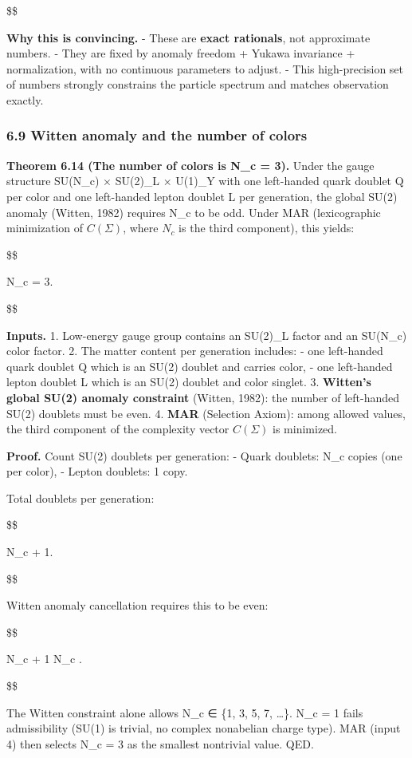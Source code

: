 \documentclass[11pt,a4paper]{article}
\theoremstyle{remark}
\begin{document}
\$\$

\textbf{Why this is convincing.}
- These are \textbf{exact rationals}, not approximate numbers.
- They are fixed by anomaly freedom + Yukawa invariance + normalization,
with no continuous parameters to adjust.
- This high-precision set of numbers strongly constrains the particle
spectrum and matches observation exactly.

\subsubsection{6.9 Witten anomaly and the number of colors}\label{witten-anomaly-and-the-number-of-colors}

\textbf{Theorem 6.14 (The number of colors is N\_c = 3).}
Under the gauge structure SU(N\_c) × SU(2)\_L × U(1)\_Y with one
left-handed quark doublet Q per color and one left-handed lepton doublet
L per generation, the global SU(2) anomaly (Witten, 1982) requires
N\_c to be odd. Under MAR (lexicographic minimization of \(C(\Sigma)\),
where \(N_c\) is the third component), this yields:

\$\$

N\_c = 3.

\$\$

\textbf{Inputs.}
1. Low-energy gauge group contains an SU(2)\_L factor and an SU(N\_c)
color factor.
2. The matter content per generation includes:
- one left-handed quark doublet Q which is an SU(2) doublet and
carries color,
- one left-handed lepton doublet L which is an SU(2) doublet and
color singlet.
3. \textbf{Witten's global SU(2) anomaly constraint} (Witten, 1982): the
number of left-handed SU(2) doublets must be even.
4. \textbf{MAR} (Selection Axiom): among allowed values, the third component
of the complexity vector \(C(\Sigma)\) is minimized.

\textbf{Proof.} Count SU(2) doublets per generation:
- Quark doublets: N\_c copies (one per color),
- Lepton doublets: 1 copy.

Total doublets per generation:

\$\$

N\_c + 1.

\$\$

Witten anomaly cancellation requires this to be even:

\$\$

N\_c + 1   \quad \Rightarrow \quad N\_c .

\$\$

The Witten constraint alone allows N\_c ∈ \{1, 3, 5, 7, \ldots\}. N\_c = 1
fails admissibility (SU(1) is trivial, no complex nonabelian charge type).
MAR (input 4) then selects N\_c = 3 as the smallest nontrivial value. QED.
\end{document}
